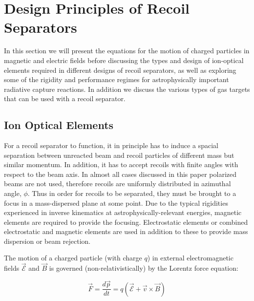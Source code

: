 \section{Design Principles of Recoil Separators}
\label{design}

In this section we will present the equations for the motion of charged particles in magnetic and electric fields before discussing the types and design of ion-optical elements required in different designs of recoil separators, as well as exploring some of the rigidity and performance regimes for astrophysically important radiative capture reactions. In addition we discuss the various types of gas targets that can be used with a recoil separator.

\subsection{Ion Optical Elements}
\label{ion}

For a recoil separator to function, it in principle has to induce a spacial separation between unreacted beam and recoil particles of different mass but similar momentum. In addition, it has to accept recoils with finite angles with respect to the beam axis. In almost all cases discussed in this paper polarized beams are not used, therefore recoils are uniformly distributed in azimuthal angle, $\phi$. 
Thus in order for recoils to be separated, they must be brought to a focus in a mass-dispersed plane at some point. Due to the typical rigidities experienced in inverse kinematics at astrophysically-relevant energies, magnetic elements are required to provide the focusing. Electrostatic elements or combined electrostatic and magnetic elements are used in addition to these to provide mass dispersion or beam rejection.  

The motion of a charged particle (with charge $q$) in external electromagnetic fields $\vec{\mathcal{E}}$ and $\vec{B}$  is governed (non-relativistically) by the Lorentz force equation:

\begin{equation}
\vec{F}=\frac{d\vec{p}}{dt}=q(\vec{\mathcal{E}}+\vec{v}\times\vec{B})
\end{equation}   

